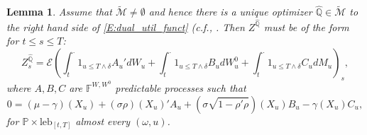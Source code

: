 \documentclass[11pt, letterpaper]{amsart}
\newtheorem{lemma}[theorem]{Lemma}
\theoremstyle{definition}
\theoremstyle{remark}
\numberwithin{equation}{section}
\newcommand{\prob}{\mathbb{P}}
\newcommand{\qprob}{\mathbb{Q}}
\newcommand{\tM}{\widetilde{\mathcal{M}}}
\newcommand{\filt}{\mathbb{F}}
\newcommand{\EN}{\mathcal{E}}
\begin{document}
\begin{lemma}\label{L:dual_opt_structure}
Assume that $\tM\neq\emptyset$ and hence there is a unique optimizer $\hat{\qprob}\in\tM$ to the right hand side of \eqref{E:dual_util_funct} (c.f., \cite[Theorem 1.1]{MR2489605}. Then $Z^{\hat{\qprob}}$ must be of the form for $t\leq s\leq T$:
\begin{equation}\label{E:Z_Q_structure}
Z^{\hat{\qprob}}_s = \EN\left(\int_t^{\cdot} 1_{u\leq T\wedge\delta} A_u'dW_u + \int_t^\cdot 1_{u\leq T\wedge\delta} B_u dW^0_u + \int_{t}^\cdot 1_{u\leq T\wedge\delta} C_u dM_u\right)_s,
\end{equation}
where $A, B, C$ are $\filt^{W,W^0}$ predictable processes such that
\begin{equation}\label{E:mkt_px_of_risk}
0 = (\mu-\gamma)(X_u) + (\sigma\rho)(X_u)'A_u + (\sigma\sqrt{1-\rho'\rho})(X_u)B_u - \gamma(X_u)C_u,
\end{equation}
for $\prob\times\textrm{leb}_{[t,T]}$ almost every $(\omega,u)$.
\end{lemma}
\end{document}
